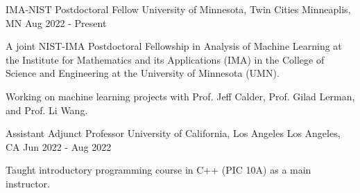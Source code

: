 

\begin{cventries}

  \cventry
    {IMA-NIST Postdoctoral Fellow} %
    {University of Minnesota, Twin Cities} %
    {Minneaplis, MN} %
    {Aug 2022 - Present} %
    {
      \begin{cvitems} %
        \item {A joint NIST-IMA Postdoctoral Fellowship in Analysis of Machine Learning at the Institute for Mathematics and its Applications (IMA) in the College of Science and Engineering at the University of Minnesota (UMN).}
        \item {Working on machine learning projects with Prof. Jeff Calder, Prof. Gilad Lerman, and Prof. Li Wang.}
      \end{cvitems}
    }

  \cventry
    {Assistant Adjunct Professor} %
    {University of California, Los Angeles} %
    {Los Angeles, CA} %
    {Jun 2022 - Aug 2022} %
    {
      \begin{cvitems} %
        \item {Taught introductory programming course in C++ (PIC 10A) as a main instructor.}
      \end{cvitems}
    }

\end{cventries}

